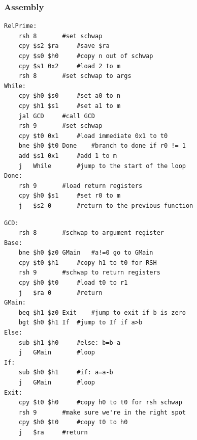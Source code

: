 \documentclass{article}
\begin{document}
		\subsubsection{Assembly}
			\begin{lstlisting}[frame=single]
RelPrime:
	rsh	8		#set schwap
	cpy	$s2 $ra		#save $ra
	cpy	$s0 $h0		#copy n out of schwap
	cpy	$s1 0x2		#load 2 to m
	rsh	8		#set schwap to args
While:
	cpy	$h0 $s0		#set a0 to n
	cpy	$h1 $s1		#set a1 to m
	jal	GCD		#call GCD
	rsh	9		#set schwap
	cpy	$t0 0x1		#load immediate 0x1 to t0
	bne	$h0 $t0 Done	#branch to done if r0 != 1
	add	$s1 0x1		#add 1 to m
	j	While		#jump to the start of the loop
Done:
	rsh	9		#load return registers
	cpy	$h0 $s1		#set r0 to m
	j	$s2 0		#return to the previous function
			\end{lstlisting}
			\begin{lstlisting}[frame=single]
GCD:
	rsh	8		#schwap to argument register
Base:
	bne	$h0 $z0 GMain	#a!=0 go to GMain
	cpy	$t0 $h1		#copy h1 to t0 for RSH
	rsh	9		#schwap to return registers
	cpy	$h0 $t0		#load t0 to r1
	j	$ra 0		#return
GMain:
	beq	$h1 $z0 Exit	#jump to exit if b is zero
	bgt	$h0 $h1 If	#jump to If if a>b
Else:
	sub	$h1 $h0		#else: b=b-a
	j	GMain		#loop
If:
	sub	$h0 $h1		#if: a=a-b
	j	GMain		#loop
Exit:
	cpy	$t0 $h0		#copy h0 to t0 for rsh schwap
	rsh	9		#make sure we're in the right spot
	cpy	$h0 $t0		#copy t0 to h0
	j	$ra		#return
			\end{lstlisting}
\end{document}
